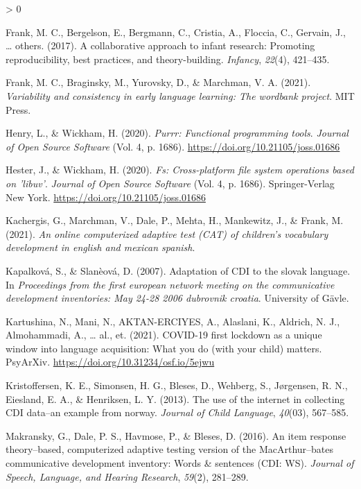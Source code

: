 \documentclass[
  english,
  ,man,floatsintext]{apa6}
\newlength{\cslhangindent}
\newenvironment{CSLReferences}[2] %
 {%
  \setlength{\parindent}{0pt}
  \ifodd #1 \everypar{\setlength{\hangindent}{\cslhangindent}}\ignorespaces\fi
  \ifnum #2 > 0
  \setlength{\parskip}{#2\baselineskip}
  \fi
 }%
 {}
\begin{document}
\begin{CSLReferences}{1}{0}
\leavevmode\hypertarget{ref-frank2017}{}%
Frank, M. C., Bergelson, E., Bergmann, C., Cristia, A., Floccia, C., Gervain, J., \ldots{} others. (2017). A collaborative approach to infant research: Promoting reproducibility, best practices, and theory-building. \emph{Infancy}, \emph{22}(4), 421--435.

\leavevmode\hypertarget{ref-Frank2021}{}%
Frank, M. C., Braginsky, M., Yurovsky, D., \& Marchman, V. A. (2021). \emph{Variability and consistency in early language learning: The wordbank project}. MIT Press.

\leavevmode\hypertarget{ref-R-purrr}{}%
Henry, L., \& Wickham, H. (2020). \emph{Purrr: Functional programming tools}. \emph{Journal of Open Source Software} (Vol. 4, p. 1686). \url{https://doi.org/10.21105/joss.01686}

\leavevmode\hypertarget{ref-R-fs}{}%
Hester, J., \& Wickham, H. (2020). \emph{Fs: Cross-platform file system operations based on 'libuv'}. \emph{Journal of Open Source Software} (Vol. 4, p. 1686). Springer-Verlag New York. \url{https://doi.org/10.21105/joss.01686}

\leavevmode\hypertarget{ref-Kachergis}{}%
Kachergis, G., Marchman, V., Dale, P., Mehta, H., Mankewitz, J., \& Frank, M. (2021). \emph{An online computerized adaptive test (CAT) of children's vocabulary development in english and mexican spanish}.

\leavevmode\hypertarget{ref-Kapalkova2007}{}%
Kapalková, S., \& Slanèová, D. (2007). Adaptation of CDI to the slovak language. In \emph{Proceedings from the first european network meeting on the communicative development inventories: May 24-28 2006 dubrovnik croatia}. University of Gävle.

\leavevmode\hypertarget{ref-Kartushina2021}{}%
Kartushina, N., Mani, N., AKTAN-ERCIYES, A., Alaslani, K., Aldrich, N. J., Almohammadi, A., \ldots{} al., et. (2021). COVID-19 first lockdown as a unique window into language acquisition: What you do (with your child) matters. PsyArXiv. \url{https://doi.org/10.31234/osf.io/5ejwu}

\leavevmode\hypertarget{ref-kristoffersen2013}{}%
Kristoffersen, K. E., Simonsen, H. G., Bleses, D., Wehberg, S., Jørgensen, R. N., Eiesland, E. A., \& Henriksen, L. Y. (2013). The use of the internet in collecting CDI data--an example from norway. \emph{Journal of Child Language}, \emph{40}(03), 567--585.

\leavevmode\hypertarget{ref-makransky2016}{}%
Makransky, G., Dale, P. S., Havmose, P., \& Bleses, D. (2016). An item response theory--based, computerized adaptive testing version of the MacArthur--bates communicative development inventory: Words \& sentences (CDI: WS). \emph{Journal of Speech, Language, and Hearing Research}, \emph{59}(2), 281--289.


\end{CSLReferences}
\end{document}
